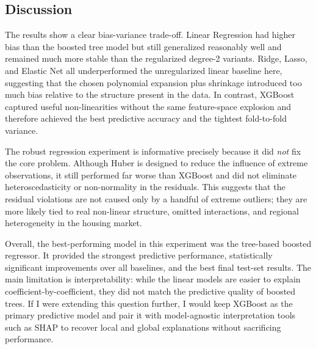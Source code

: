 \subsection{Discussion}

The results show a clear bias-variance trade-off. Linear Regression had higher bias than the boosted tree model but still generalized reasonably well and remained much more stable than the regularized degree-2 variants. Ridge, Lasso, and Elastic Net all underperformed the unregularized linear baseline here, suggesting that the chosen polynomial expansion plus shrinkage introduced too much bias relative to the structure present in the data. In contrast, XGBoost captured useful non-linearities without the same feature-space explosion and therefore achieved the best predictive accuracy and the tightest fold-to-fold variance.

The robust regression experiment is informative precisely because it did \emph{not} fix the core problem. Although Huber is designed to reduce the influence of extreme observations, it still performed far worse than XGBoost and did not eliminate heteroscedasticity or non-normality in the residuals. This suggests that the residual violations are not caused only by a handful of extreme outliers; they are more likely tied to real non-linear structure, omitted interactions, and regional heterogeneity in the housing market.

Overall, the best-performing model in this experiment was the tree-based boosted regressor. It provided the strongest predictive performance, statistically significant improvements over all baselines, and the best final test-set results. The main limitation is interpretability: while the linear models are easier to explain coefficient-by-coefficient, they did not match the predictive quality of boosted trees. If I were extending this question further, I would keep XGBoost as the primary predictive model and pair it with model-agnostic interpretation tools such as SHAP to recover local and global explanations without sacrificing performance.
